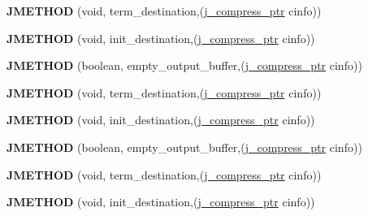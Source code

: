 \begin{DoxyCompactItemize}
\item 
\mbox{\label{structjpeg__destination__mgr_a1158df5e49ecfa2a7d0905eef216afbf}} 
{\bfseries J\+M\+E\+T\+H\+OD} (void, term\+\_\+destination,(\hyperlink{structjpeg__compress__struct}{j\+\_\+compress\+\_\+ptr} cinfo))
\item 
\mbox{\label{structjpeg__destination__mgr_ae29d14eb632140c7c67eda8c5824383c}} 
{\bfseries J\+M\+E\+T\+H\+OD} (void, init\+\_\+destination,(\hyperlink{structjpeg__compress__struct}{j\+\_\+compress\+\_\+ptr} cinfo))
\item 
\mbox{\label{structjpeg__destination__mgr_a7357b5d5cab543cfa243dd59f101b8f2}} 
{\bfseries J\+M\+E\+T\+H\+OD} (boolean, empty\+\_\+output\+\_\+buffer,(\hyperlink{structjpeg__compress__struct}{j\+\_\+compress\+\_\+ptr} cinfo))
\item 
\mbox{\label{structjpeg__destination__mgr_a1158df5e49ecfa2a7d0905eef216afbf}} 
{\bfseries J\+M\+E\+T\+H\+OD} (void, term\+\_\+destination,(\hyperlink{structjpeg__compress__struct}{j\+\_\+compress\+\_\+ptr} cinfo))
\item 
\mbox{\label{structjpeg__destination__mgr_ae29d14eb632140c7c67eda8c5824383c}} 
{\bfseries J\+M\+E\+T\+H\+OD} (void, init\+\_\+destination,(\hyperlink{structjpeg__compress__struct}{j\+\_\+compress\+\_\+ptr} cinfo))
\item 
\mbox{\label{structjpeg__destination__mgr_a7357b5d5cab543cfa243dd59f101b8f2}} 
{\bfseries J\+M\+E\+T\+H\+OD} (boolean, empty\+\_\+output\+\_\+buffer,(\hyperlink{structjpeg__compress__struct}{j\+\_\+compress\+\_\+ptr} cinfo))
\item 
\mbox{\label{structjpeg__destination__mgr_a1158df5e49ecfa2a7d0905eef216afbf}} 
{\bfseries J\+M\+E\+T\+H\+OD} (void, term\+\_\+destination,(\hyperlink{structjpeg__compress__struct}{j\+\_\+compress\+\_\+ptr} cinfo))
\item 
\mbox{\label{structjpeg__destination__mgr_ae29d14eb632140c7c67eda8c5824383c}} 
{\bfseries J\+M\+E\+T\+H\+OD} (void, init\+\_\+destination,(\hyperlink{structjpeg__compress__struct}{j\+\_\+compress\+\_\+ptr} cinfo))

\end{DoxyCompactItemize}
